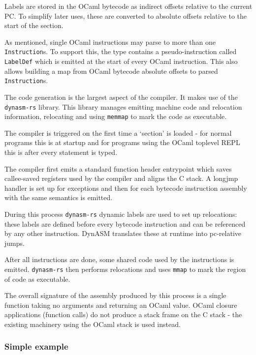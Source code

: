 Labels are stored in the OCaml bytecode as indirect offsets relative to the current PC. To simplify
later uses, these are converted to absolute offsets relative to the start of the section.

As mentioned, single OCaml instructions may parse to more than one \texttt{Instruction}s. To
support this, the type contains a pseudo-instruction called \texttt{LabelDef} which is emitted at
the start of every OCaml instruction. This also allows building a map from OCaml bytecode
absolute offsets to parsed \texttt{Instruction}s.


The code generation is the largest aspect of the compiler. It makes use of the \texttt{dynasm-rs}
library. This library manages emitting machine code and relocation information, relocating and
using \texttt{memmap} to mark the code as executable.

The compiler is triggered on the first time a `section' is loaded - for normal programs this is at
startup and for programs using the OCaml toplevel REPL this is after every statement is typed.

The compiler first emits a standard function header entrypoint which saves callee-saved registers
used by the compiler and aligns the C stack. A longjmp handler is set up for exceptions and then
for each bytecode instruction assembly with the same semantics is emitted.

During this process \texttt{dynasm-rs} dynamic labels are used to set up relocations: these
labels are defined before every bytecode instruction and can be referenced by any other
instruction. DynASM translates these at runtime into pc-relative jumps.

After all instructions are done, some shared code used by the instructions is emitted.
\texttt{dynasm-rs} then performs relocations and uses \texttt{mmap} to mark the region of code as
executable.

The overall signature of the assembly produced by this process is a single function taking no
arguments and returning an OCaml value. OCaml closure applications (function calls) do not produce
a stack frame on the C stack - the existing machinery using the OCaml stack is used instead.

\subsubsection{Simple example}

